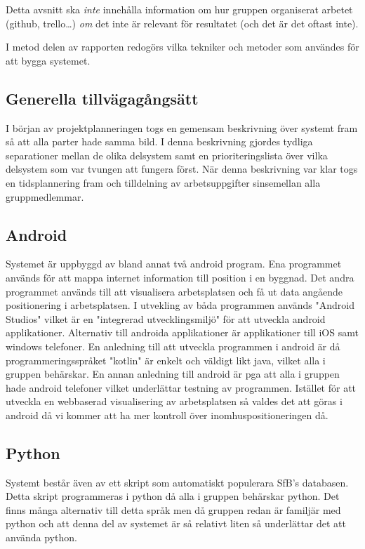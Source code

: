 \documentclass[a4paper,12pt]{article}
\begin{document}
Detta avsnitt
ska \emph{inte} innehålla information om hur gruppen organiserat arbetet (github, trello\ldots) \emph{om} det inte är relevant för resultatet (och det är det oftast inte).

I metod delen av rapporten redogörs vilka tekniker och metoder som användes för att bygga systemet.

\subsection{Generella tillvägagångsätt}
I början av projektplanneringen togs en gemensam beskrivning över systemt fram så att alla parter hade samma bild. I denna beskrivning gjordes tydliga separationer mellan de olika delsystem samt en prioriteringslista över vilka delsystem som var tvungen att fungera först. När denna beskrivning var klar togs en tidsplannering fram och tilldelning av arbetsuppgifter sinsemellan alla gruppmedlemmar.

\subsection{Android}
Systemet är uppbyggd av bland annat två android program. Ena programmet används för att mappa internet information till position i en byggnad. Det andra programmet används till att visualisera arbetsplatsen och få ut data angående positionering i arbetsplatsen. I utvekling av båda programmen används "Android Studios" vilket är en "integrerad utvecklingsmiljö" för att utveckla android applikationer. Alternativ till androida applikationer är applikationer till iOS samt windows telefoner. En anledning till att utveckla programmen i android är då programmeringsspråket "kotlin" är enkelt och väldigt likt java, vilket alla i gruppen behärskar. En annan anledning till android är pga att alla i gruppen hade android telefoner vilket underlättar testning av programmen. Istället för att utveckla en webbaserad visualisering av arbetsplatsen så valdes det att göras i android då vi kommer att ha mer kontroll över inomhuspositioneringen då. %

\subsection{Python}
Systemt består även av ett skript som automatiskt populerara SfB's databasen. Detta skript programmeras i python då alla i gruppen behärskar python. Det finns många alternativ till detta språk men då gruppen redan är familjär med python och att denna del av systemet är så relativt liten så underlättar det att använda python.
\end{document}
